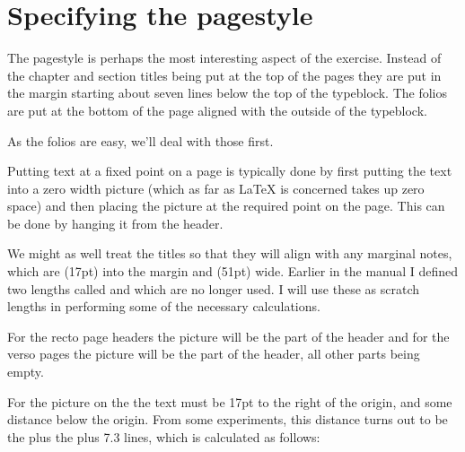 \section{Specifying the pagestyle}

    The pagestyle is perhaps the most interesting aspect of the exercise.
Instead of the chapter and section titles being put at the top of the
pages they are put in the margin starting about seven lines 
below the top of the typeblock. The folios 
are put at the bottom of the page aligned with the outside of the 
typeblock.

    As the folios are easy, we'll deal with those first.
\begin{lcode}
\end{lcode}

    Putting text at a fixed point on a page is typically done by
first putting the text into a zero width picture (which as far as LaTeX
is concerned takes up zero space) and then placing the picture at the
required point on the page. This can be done by hanging it from the
header.

    We might as well treat the titles so that they will align with any 
marginal notes, which are \lnc{\marginparsep} (17pt) 
into the margin 
and \lnc{\marginparwidth} (51pt) wide. Earlier in the manual I defined
two lengths called \lnc{\pwlayi} and \lnc{\pwlayii} which are no longer used.
I will use these as scratch lengths in 
performing some of the necessary calculations.

    For the recto page headers the picture will be 
the  part of the header and for the verso pages 
the picture will be the 
part of the header, all other parts being empty. 

    For the picture on the  the text must be 17pt to
the right of the origin, and some distance below the origin.
From some experiments, this distance turns out to be the \lnc{\headsep}
plus the \cmd{\topskip} plus 7.3 lines, which is calculated as follows:
\begin{lcode}
\setlength{\pwlayi}{\headsep}
\addtolength{\pwlayi}{\topskip}
\addtolength{\pwlayi}{7.3\onelineskip}
\end{lcode}

